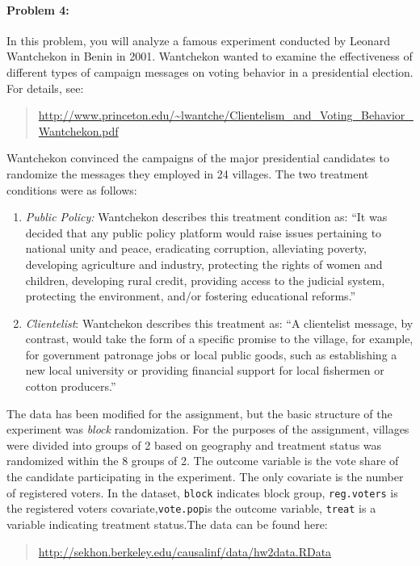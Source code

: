 \documentclass{article}
\begin{document}
\paragraph{Problem 4:}
In this problem, you will analyze a famous experiment conducted by Leonard Wantchekon in Benin in 2001. Wantchekon wanted to examine the effectiveness of different types of campaign messages on voting behavior in a presidential election.
For details, see:
\begin{quote}
  \url{http://www.princeton.edu/~lwantche/Clientelism_and_Voting_Behavior_Wantchekon.pdf}
\end{quote}

Wantchekon convinced the campaigns of the major presidential
candidates to randomize the messages they employed in 24 villages. The
two treatment conditions were as follows:
\begin{enumerate}
\item \textit{Public Policy:} Wantchekon describes this treatment condition as: ``It was decided that any public policy platform would raise issues pertaining to national unity and peace, eradicating corruption, alleviating poverty, developing agriculture and industry, protecting the rights of women and children, developing rural credit, providing access to the judicial system, protecting the environment, and/or fostering educational reforms.''
\item \textit{Clientelist}: Wantchekon describes this treatment as: ``A clientelist message, by contrast, would take the form of a specific promise to the village, for example, for government patronage jobs or local public goods, such as establishing a new local university or providing financial support for local fishermen or cotton producers.''
\end{enumerate}

The data has been modified for the assignment, but the basic structure
of the experiment was \textit{block} randomization. For the purposes
of the assignment, villages were divided into groups of 2 based on
geography and treatment status was randomized within the 8 groups of
2. The outcome variable is the vote share of the candidate
participating in the experiment. The only covariate is the number of
registered voters. In the dataset, \texttt{block} indicates block
group, \texttt{reg.voters} is the registered voters
covariate,\texttt{vote.pop}is the outcome variable, \texttt{treat} is
a variable indicating treatment status.The data can be found here: 
\begin{quote}
  \url{http://sekhon.berkeley.edu/causalinf/data/hw2data.RData} \\
\end{quote} 
\end{document}
